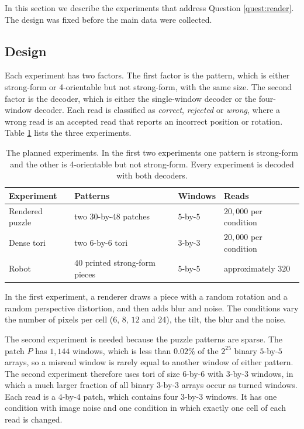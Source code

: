 \documentclass{lipics-v2021}
\begin{document}
In this section we describe the experiments that address Question \ref{quest:reader}.
The design was fixed before the main data were collected.

\subsection{Design}
\label{sec:experiments_design}

Each experiment has two factors.
The first factor is the pattern, which is either strong-form or 4-orientable but not strong-form, with the same size.
The second factor is the decoder, which is either the single-window decoder or the four-window decoder.
Each read is classified as \emph{correct}, \emph{rejected} or \emph{wrong}, where a wrong read is an accepted read that reports an incorrect position or rotation.
Table \ref{tab:experiments} lists the three experiments.

\begin{table}[htbp]
\centering
\small
\begin{tabular}{@{}llll@{}}
\toprule
Experiment & Patterns & Windows & Reads \\
\midrule
Rendered puzzle & two $30$-by-$48$ patches & $5$-by-$5$ & $20{,}000$ per condition \\
Dense tori & two $6$-by-$6$ tori & $3$-by-$3$ & $20{,}000$ per condition \\
Robot & $40$ printed strong-form pieces & $5$-by-$5$ & approximately $320$ \\
\bottomrule
\end{tabular}
\caption{The planned experiments.
In the first two experiments one pattern is strong-form and the other is 4-orientable but not strong-form.
Every experiment is decoded with both decoders.}
\label{tab:experiments}
\end{table}

In the first experiment, a renderer draws a piece with a random rotation and a random perspective distortion, and then adds blur and noise.
The conditions vary the number of pixels per cell ($6$, $8$, $12$ and $24$), the tilt, the blur and the noise.

The second experiment is needed because the puzzle patterns are sparse.
The patch $P$ has $1{,}144$ windows, which is less than $0.02\%$ of the $2^{25}$ binary $5$-by-$5$ arrays, so a misread window is rarely equal to another window of either pattern.
The second experiment therefore uses tori of size $6$-by-$6$ with $3$-by-$3$ windows, in which a much larger fraction of all binary $3$-by-$3$ arrays occur as turned windows.
Each read is a $4$-by-$4$ patch, which contains four $3$-by-$3$ windows.
It has one condition with image noise and one condition in which exactly one cell of each read is changed.
\end{document}
